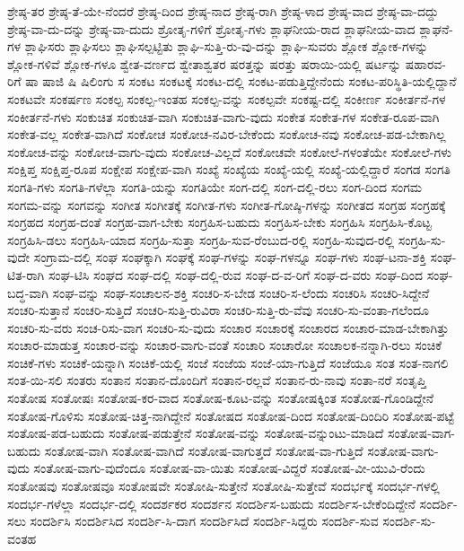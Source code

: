 {ಶ್ರೇಷ್ಠ-ತರ
ಶ್ರೇಷ್ಠ-ತೆ-ಯೇ-ನೆಂದರೆ
ಶ್ರೇಷ್ಠ-ದಿಂದ
ಶ್ರೇಷ್ಠ-ನಾದ
ಶ್ರೇಷ್ಠ-ರಾಗಿ
ಶ್ರೇಷ್ಠ-ಳಾದ
ಶ್ರೇಷ್ಠ-ವಾದ
ಶ್ರೇಷ್ಠ-ವಾ-ದದ್ದು
ಶ್ರೇಷ್ಠ-ವಾ-ದು-ದನ್ನು
ಶ್ರೇಷ್ಠ-ವಾ-ದುದು
ಶ್ರೋತೃ-ಗಳಿಗೆ
ಶ್ರೋತೃ-ಗಳು
ಶ್ಲಾಘನೀಯ-ರಾದ
ಶ್ಲಾಘನೀಯ-ವಾದ
ಶ್ಲಾಘನೆ-ಗಳ
ಶ್ಲಾಘಿಸರು
ಶ್ಲಾಘಿಸಲು
ಶ್ಲಾಘಿಸಲ್ಪಟ್ಟಿತು
ಶ್ಲಾಘಿ-ಸುತ್ತಿ-ರು-ವು-ದನ್ನು
ಶ್ಲಾಘಿ-ಸುವರು
ಶ್ಲೋಕ
ಶ್ಲೋಕ-ಗಳನ್ನು
ಶ್ಲೋಕ-ಗಳಿವೆ
ಶ್ಲೋಕ-ಗಳೂ
ಶ್ವೇತ-ವರ್ಣದ
ಶ್ವೇತಾಶ್ವತರ
ಷರತ್ತನ್ನು
ಷರತ್ತು
ಷರಾಯಿ-ಯಲ್ಲಿ
ಷರ್ಟನ್ನು
ಷಹಾರವ-ರಿಗೆ
ಷಾ
ಷಾಜಿ
ಷಿ
ಷಿಲಿಂಗು
ಸ
ಸಂಕಟ
ಸಂಕಟಕ್ಕೆ
ಸಂಕಟ-ದಲ್ಲಿ
ಸಂಕಟ-ಪಡುತ್ತಿದ್ದೇನೆಂದು
ಸಂಕಟ-ಪರಿಸ್ಥಿತಿ-ಯಲ್ಲಿದ್ದಾನೆ
ಸಂಕಟವೇ
ಸಂಕರ್ಷಣ
ಸಂಕಲ್ಪ
ಸಂಕಲ್ಪ-ಇಂತಹ
ಸಂಕಲ್ಪ-ವನ್ನು
ಸಂಕಲ್ಪವೇ
ಸಂಕಷ್ಟ-ದಲ್ಲಿ
ಸಂಕೀರ್ಣ
ಸಂಕೀರ್ತನೆ-ಗಳ
ಸಂಕೀರ್ತನೆ-ಗಳು
ಸಂಕುಚಿತ
ಸಂಕುಚಿತ-ವಾಗಿ
ಸಂಕುಚಿತ-ವಾಗು-ವುದು
ಸಂಕೇತ
ಸಂಕೇತ-ಗಳ
ಸಂಕೇತ-ರೂಪ-ವಾಗಿ
ಸಂಕೇತ-ವಲ್ಲ
ಸಂಕೇತ-ವಾಗಿದೆ
ಸಂಕೋಚ
ಸಂಕೋಚ-ನವಿರ-ಬೇಕೆಂದು
ಸಂಕೋಚ-ನವು
ಸಂಕೋಚ-ಪಡ-ಬೇಕಾಗಿಲ್ಲ
ಸಂಕೋಚ-ವನ್ನು
ಸಂಕೋಚ-ವಾಗು-ವುದು
ಸಂಕೋಚ-ವಿಲ್ಲದೆ
ಸಂಕೋಚವೇ
ಸಂಕೋಲೆ-ಗಳಂತೆಯೇ
ಸಂಕೋಲೆ-ಗಳು
ಸಂಕ್ಷಿಪ್ತ
ಸಂಕ್ಷಿಪ್ತ-ರೂಪ
ಸಂಕ್ಷೇಪ
ಸಂಕ್ಷೇಪ-ವಾಗಿ
ಸಂಖ್ಯೆ
ಸಂಖ್ಯೆಯ
ಸಂಖ್ಯೆ-ಯಲ್ಲಿ
ಸಂಖ್ಯೆ-ಯಲ್ಲಿದ್ದಾರೆ
ಸಂಗಡ
ಸಂಗತಿ
ಸಂಗತಿ-ಗಳು
ಸಂಗತಿ-ಗಳೆಲ್ಲಾ
ಸಂಗತಿ-ಯನ್ನು
ಸಂಗತಿಯೇ
ಸಂಗ-ದಲ್ಲಿ
ಸಂಗ-ದಲ್ಲಿ-ರಲು
ಸಂಗ-ದಿಂದ
ಸಂಗಮ
ಸಂಗಮ-ವನ್ನು
ಸಂಗವನ್ನು
ಸಂಗೀತ
ಸಂಗೀತಕ್ಕೆ
ಸಂಗೀತ-ಗಳು
ಸಂಗೀತ-ಗೋಷ್ಠಿ-ಗಳನ್ನು
ಸಂಗೀತದ
ಸಂಗ್ರಹ
ಸಂಗ್ರಹಕ್ಕೆ
ಸಂಗ್ರಹದ
ಸಂಗ್ರಹ-ದಂತೆ
ಸಂಗ್ರಹ-ವಾಗ-ಬೇಕು
ಸಂಗ್ರಹಿಸ-ಬಹುದು
ಸಂಗ್ರಹಿಸ-ಬೇಕು
ಸಂಗ್ರಹಿಸಿ
ಸಂಗ್ರಹಿಸಿ-ಕೊಟ್ಟ
ಸಂಗ್ರಹಿಸಿ-ಡಲು
ಸಂಗ್ರಹಿಸಿ-ಯಾದ
ಸಂಗ್ರಹಿ-ಸುತ್ತಾ
ಸಂಗ್ರಹಿ-ಸುವ-ರೆಂಬುದ-ರಲ್ಲಿ
ಸಂಗ್ರಹಿ-ಸುವುದ-ರಲ್ಲಿ
ಸಂಗ್ರಹಿ-ಸು-ವುದೇ
ಸಂಗ್ರಾಮ-ದಲ್ಲಿ
ಸಂಘ
ಸಂಘಕ್ಕಾಗಿ
ಸಂಘಕ್ಕೆ
ಸಂಘ-ಗಳನ್ನು
ಸಂಘ-ಗಳನ್ನೂ
ಸಂಘ-ಗಳು
ಸಂಘ-ಟನಾ-ಶಕ್ತಿ
ಸಂಘ-ಟಿತ-ರಾಗಿ
ಸಂಘ-ಟಿಸಿ
ಸಂಘದ
ಸಂಘ-ದಲ್ಲಿ
ಸಂಘ-ದಲ್ಲಿ-ರುವ
ಸಂಘ-ದ-ವ-ರಿಗೆ
ಸಂಘ-ದ-ವರು
ಸಂಘ-ದಿಂದ
ಸಂಘ-ಬದ್ಧ-ವಾಗಿ
ಸಂಘ-ವನ್ನು
ಸಂಘ-ಸಂಚಾಲನ-ಶಕ್ತಿ
ಸಂಚರಿ-ಸ-ಬೇಡ
ಸಂಚರಿ-ಸ-ಲೆಂದು
ಸಂಚರಿಸಿ
ಸಂಚರಿ-ಸಿದ್ದೇನೆ
ಸಂಚರಿ-ಸುತ್ತಾನೆ
ಸಂಚರಿ-ಸುತ್ತಿದೆ
ಸಂಚರಿ-ಸುತ್ತಿ-ರುವಿರಾ
ಸಂಚರಿ-ಸುತ್ತಿ-ರು-ವೆವು
ಸಂಚರಿ-ಸು-ವಂತಾ-ಗಲೆಂದೂ
ಸಂಚರಿ-ಸು-ವರು
ಸಂಚ-ರಿಸು-ವಾಗ
ಸಂಚರಿ-ಸು-ವುದು
ಸಂಚಾರ
ಸಂಚಾರಕ್ಕೆ
ಸಂಚಾರದ
ಸಂಚಾರ-ಮಾಡ-ಬೇಕಾಗಿತ್ತು
ಸಂಚಾರ-ಮಾಡುತ್ತ
ಸಂಚಾರ-ವನ್ನು
ಸಂಚಾರ-ವಾಗು-ವಂತೆ
ಸಂಚಾರಿ
ಸಂಚಾರೋ
ಸಂಚಾಲಕ-ನನ್ನಾಗಿ-ರಲು
ಸಂಚಿಕೆ
ಸಂಚಿಕೆ-ಗಳು
ಸಂಚಿಕೆ-ಯನ್ನಾಗಿ
ಸಂಚಿಕೆ-ಯಲ್ಲಿ
ಸಂಜೆ
ಸಂಜೆಯ
ಸಂಜೆ-ಯಾ-ಗುತ್ತಿದೆ
ಸಂಜೆಯೂ
ಸಂತ
ಸಂತ-ನಾಗಲಿ
ಸಂತ-ಯಿ-ಸಲಿ
ಸಂತರು
ಸಂತಾನ
ಸಂತಾನ-ದೊಂದಿಗೆ
ಸಂತಾನ-ರಲ್ಲವೆ
ಸಂತಾನ-ರು-ನಾವು
ಸಂತಾ-ನರೆ
ಸಂತೃಪ್ತಿ
ಸಂತೋಷ
ಸಂತೋಷಃ
ಸಂತೋಷ-ಕರ-ವಾದ
ಸಂತೋಷ-ಕೂಟ-ವನ್ನು
ಸಂತೋಷಕ್ಕಿಂತ
ಸಂತೋಷ-ಗೊಂಡಿದ್ದೇನೆ
ಸಂತೋಷ-ಗೊಳಿಸು
ಸಂತೋಷ-ಚಿತ್ತ-ನಾಗಿದ್ದೇನೆ
ಸಂತೋಷದ
ಸಂತೋಷ-ದಿಂದ
ಸಂತೋಷ-ದಿಂದಿರಿ
ಸಂತೋಷ-ಪಟ್ಟೆ
ಸಂತೋಷ-ಪಡ-ಬಹುದು
ಸಂತೋಷ-ಪಡುತ್ತೇನೆ
ಸಂತೋಷ-ವನ್ನು
ಸಂತೋಷ-ವನ್ನುಂಟು-ಮಾಡಿದೆ
ಸಂತೋಷ-ವಾಗ-ಬಹುದು
ಸಂತೋಷ-ವಾಗಿ
ಸಂತೋಷ-ವಾಗಿದೆ
ಸಂತೋಷ-ವಾಗುತ್ತದೆ
ಸಂತೋಷ-ವಾ-ಗುತ್ತಿದೆ
ಸಂತೋಷ-ವಾಗು-ವುದು
ಸಂತೋಷ-ವಾಗು-ವುದೆಂದೂ
ಸಂತೋಷ-ವಾ-ಯಿತು
ಸಂತೋಷ-ವಿದ್ದರೆ
ಸಂತೋಷ-ವೀ-ಯುವಿ-ರೆಂದು
ಸಂತೋಷವು
ಸಂತೋಷವೂ
ಸಂತೋಷವೇ
ಸಂತೋಷಿ-ಸುತ್ತೇನೆ
ಸಂತೋಷಿ-ಸುತ್ತೇವೆ
ಸಂದರ್ಭಕ್ಕೆ
ಸಂದರ್ಭ-ಗಳಲ್ಲಿ
ಸಂದರ್ಭ-ಗಳೆಲ್ಲಾ
ಸಂದರ್ಭ-ದಲ್ಲಿ
ಸಂದರ್ಶಕರ
ಸಂದರ್ಶನ
ಸಂದರ್ಶಿಸ-ಬಹುದು
ಸಂದರ್ಶಿಸ-ಬೇಕೆಂದಿದ್ದೇನೆ
ಸಂದರ್ಶಿ-ಸಲು
ಸಂದರ್ಶಿಸಿ
ಸಂದರ್ಶಿಸಿದ
ಸಂದರ್ಶಿ-ಸಿ-ದಾಗ
ಸಂದರ್ಶಿಸಿದೆ
ಸಂದರ್ಶಿ-ಸಿದ್ದರು
ಸಂದರ್ಶಿ-ಸುವ
ಸಂದರ್ಶಿ-ಸು-ವಂತಹ
}
